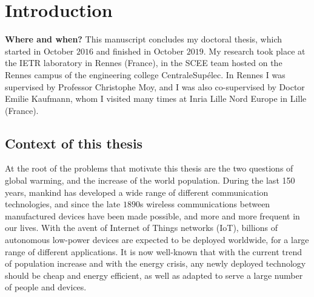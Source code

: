 
\chapter{Introduction}
\label{chapter:1}





\graphicspath{{2-Chapters/1-Chapter/Images/}}

\textbf{Where and when?}
%
This manuscript concludes my doctoral thesis, which started in October $2016$ and finished in October $2019$.
My research took place at the IETR laboratory in Rennes (France), in the SCEE team hosted on the Rennes campus of the engineering college CentraleSupélec.
In Rennes I was supervised by Professor Christophe Moy,
and I was also co-supervised by Doctor Emilie Kaufmann, whom I visited many times at Inria Lille Nord Europe in Lille (France).



\section{Context of this thesis}
\label{sec:1:problems}

%
At the root of the problems that motivate this thesis are the two questions of global warming, and the increase of the world population.
During the last 150 years, mankind has developed a wide range of different communication technologies, and since the late $1890$s wireless communications between manufactured devices have been made possible, and more and more frequent in our lives.
With the avent of Internet of Things networks (IoT), billions of autonomous low-power devices are expected to be deployed worldwide, for a large range of different applications.
It is now well-known that with the current trend of population increase and with the energy crisis, any newly deployed technology should be cheap and energy efficient,
as well as adapted to serve a large number of people and devices.

